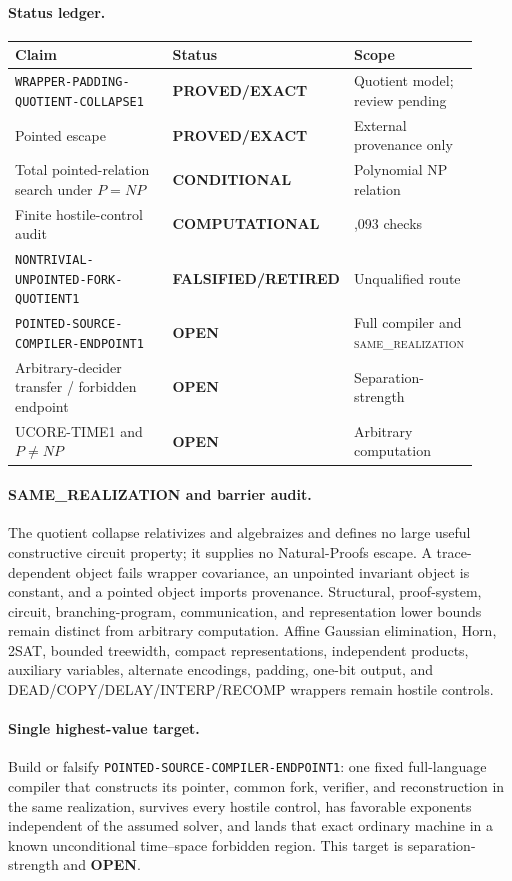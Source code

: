 \documentclass[11pt]{article}
\newcommand{\statusproved}{\textcolor{proved}{\textbf{PROVED/EXACT}}}
\newcommand{\statusopen}{\textcolor{openstatus}{\textbf{OPEN}}}
\newcommand{\statusretired}{\textcolor{retired}{\textbf{FALSIFIED/RETIRED}}}
\newcommand{\same}{\textnormal{\textsc{same\_realization}}}
\begin{document}
\paragraph{Status ledger.}
\begin{center}\scriptsize
\begin{tabular}{>{\raggedright\arraybackslash}p{0.43\linewidth}>{\raggedright\arraybackslash}p{0.22\linewidth}>{\raggedright\arraybackslash}p{0.27\linewidth}}
\toprule
Claim & Status & Scope\\ \midrule
\texttt{WRAPPER-PADDING-QUOTIENT-COLLAPSE1} & \statusproved & Quotient model; review pending\\
Pointed escape & \statusproved & External provenance only\\
Total pointed-relation search under $P=NP$ & \textbf{CONDITIONAL} & Polynomial NP relation\\
Finite hostile-control audit & \textbf{COMPUTATIONAL} & 3,093 checks\\
\texttt{NONTRIVIAL-UNPOINTED-FORK-QUOTIENT1} & \statusretired & Unqualified route\\
\texttt{POINTED-SOURCE-COMPILER-ENDPOINT1} & \statusopen & Full compiler and \same\\
Arbitrary-decider transfer / forbidden endpoint & \statusopen & Separation-strength\\
UCORE-TIME1 and $P\ne NP$ & \statusopen & Arbitrary computation\\
\bottomrule
\end{tabular}
\end{center}

\paragraph{SAME\_REALIZATION and barrier audit.}
The quotient collapse relativizes and algebraizes and defines no large useful
constructive circuit property; it supplies no Natural-Proofs escape. A
trace-dependent object fails wrapper covariance, an unpointed invariant
object is constant, and a pointed object imports provenance. Structural,
proof-system, circuit, branching-program, communication, and representation
lower bounds remain distinct from arbitrary computation. Affine Gaussian
elimination, Horn, 2SAT, bounded treewidth, compact representations,
independent products, auxiliary variables, alternate encodings, padding,
one-bit output, and DEAD/COPY/DELAY/INTERP/RECOMP wrappers remain hostile
controls.

\paragraph{Single highest-value target.}
Build or falsify \texttt{POINTED-SOURCE-COMPILER-ENDPOINT1}: one fixed
full-language compiler that constructs its pointer, common fork, verifier,
and reconstruction in the same realization, survives every hostile control,
has favorable exponents independent of the assumed solver, and lands that
exact ordinary machine in a known unconditional time--space forbidden region.
This target is separation-strength and \statusopen.
\end{document}

